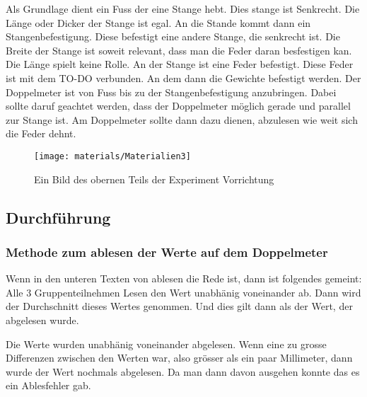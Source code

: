 \documentclass[../main.tex]{subfiles} %
\begin{document}
        Als Grundlage dient ein Fuss der eine Stange hebt. Dies stange ist Senkrecht.
        Die Länge oder Dicker der Stange ist egal. An die Stande kommt dann ein Stangenbefestigung.
        Diese befestigt eine andere Stange, die senkrecht ist.
        Die Breite der Stange ist soweit relevant, dass man die Feder daran besfestigen kan. Die Länge spielt keine Rolle.
        An der Stange ist eine Feder befestigt. Diese Feder ist mit dem TO-DO verbunden.
        An dem dann die Gewichte befestigt werden.
        Der Doppelmeter ist von Fuss bis zu der Stangenbefestigung anzubringen. Dabei sollte daruf geachtet werden, dass der Doppelmeter möglich gerade und parallel zur Stange ist.
        Am Doppelmeter sollte dann dazu dienen, abzulesen wie weit sich die Feder dehnt.
    \begin{figure}[H]
        \centering
        \texttt{[image: materials/Materialien3]}
        \caption{Ein Bild des obernen Teils der Experiment Vorrichtung  \textcolor{blue}{\underline{}}}
        \label{fig:material3}
    \end{figure}

        \subsection{Durchführung}\label{subsec:durchfuhrung}

        \subsubsection{Methode zum ablesen der Werte auf dem Doppelmeter}\label{subsubsec:methode-zum-ablesen-der-werte-auf-dem-doppelmeter}

        Wenn in den unteren Texten von ablesen die Rede ist, dann ist folgendes gemeint:
        Alle 3 Gruppenteilnehmen Lesen den Wert unabhänig voneinander ab. Dann wird der Durchschnitt dieses Wertes genommen. Und dies gilt dann als der Wert, der abgelesen wurde.

        \begin{tcolorbox}[title=Hinweis beim Ablesen]
            Die Werte wurden unabhänig voneinander abgelesen.
            Wenn eine zu grosse Differenzen zwischen den Werten war, also grösser als ein paar Millimeter, dann wurde der Wert nochmals abgelesen.
            Da man dann davon ausgehen konnte das es ein Ablesfehler gab.
        \end{tcolorbox}
\end{document}
